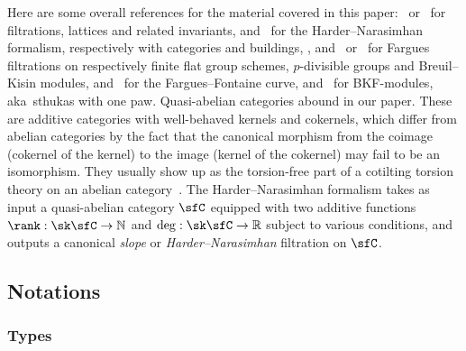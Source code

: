 Here are some overall references for the material covered in this paper:~\cite{Co14} or~\cite{Co16} for filtrations, lattices and related invariants, \cite{An09} and~\cite{Co16} for the Harder--Narasimhan formalism, respectively with categories and buildings, \cite{Fa10}, \cite{Fa12} and~\cite{Imp16} or~\cite{LeWE16} for Fargues filtrations on respectively finite flat group schemes, $p$-divisible groups and Breuil--Kisin modules, \cite{FaFo15} and~\cite{Fa15} for the Fargues--Fontaine curve, \cite{ScWe15} and~\cite{BaMoSc16} for BKF-modules, aka~sthukas with one paw. Quasi-abelian categories abound in our paper. These are additive categories with well-behaved kernels and cokernels, which differ from abelian categories by the fact that the canonical morphism from the coimage (cokernel of the kernel) to the image (kernel of the cokernel) may fail to be an isomorphism. They usually show up as the torsion-free part of a cotilting torsion theory on an abelian category~\cite[App.\ B]{BoVdB03}. The Harder--Narasimhan formalism takes as input a quasi-abelian category $\sfC$ equipped with two additive functions $\rank:\sk\sfC\rightarrow\mathbb{N}$ and $\deg:\sk\sfC\rightarrow\mathbb{R}$ subject to various conditions, and outputs a canonical \emph{slope} or \emph{Harder--Narasimhan} filtration on $\sfC$.

\subsection{Notations}

\subsubsection{Types}\label{subsec:Types}

